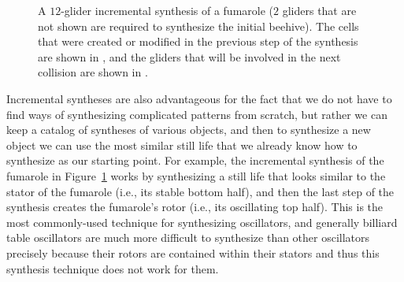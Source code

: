 \begin{figure}[!htb]
	\centering{}
	\caption{A $12$-glider incremental synthesis of a fumarole ($2$ gliders that are not shown are required to synthesize the initial beehive). The cells that were created or modified in the previous step of the synthesis are shown in , and the gliders that will be involved in the next collision are shown in .}\label{fig:fumarole_sequential}
\end{figure}

Incremental syntheses are also advantageous for the fact that we do not have to find ways of synthesizing complicated patterns from scratch, but rather we can keep a catalog of syntheses of various objects, and then to synthesize a new object we can use the most similar still life that we already know how to synthesize as our starting point. For example, the incremental synthesis of the fumarole in Figure~\ref{fig:fumarole_sequential} works by synthesizing a still life that looks similar to the stator of the fumarole (i.e., its stable bottom half), and then the last step of the synthesis creates the fumarole's rotor (i.e., its oscillating top half). This is the most commonly-used technique for synthesizing oscillators, and generally billiard table oscillators are much more difficult to synthesize than other oscillators precisely because their rotors are contained within their stators and thus this synthesis technique does not work for them.

